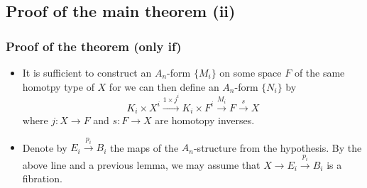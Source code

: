 \documentclass{beamer}
\theoremstyle{definition}
\begin{document}
\subsection{Proof of the main theorem (ii)}
\begin{frame}
\frametitle{Proof of the theorem (only if)}
\begin{itemize}
\item<1-> It is sufficient to construct an $A_n$-form $\{M_i\}$ on some space $F$ of the same homotpy type of $X$ for we can then define an $A_n$-form $\{N_i\}$ by 
\[K_i\times X^i\xrightarrow{1\times j^i}K_i\times F^i\xrightarrow{M_i}F\xrightarrow{s}X\]
where $j:X\to F$ and $s:F\to X$ are homotopy inverses.
\item<2-> Denote by $E_i\xrightarrow{p_i} B_i$ the maps of the $A_n$-structure from the hypothesis. By the above line and a previous lemma, we may assume that $X\to E_i\xrightarrow{p_i} B_i$ is a fibration.
\end{itemize}

\end{frame}
\end{document}
